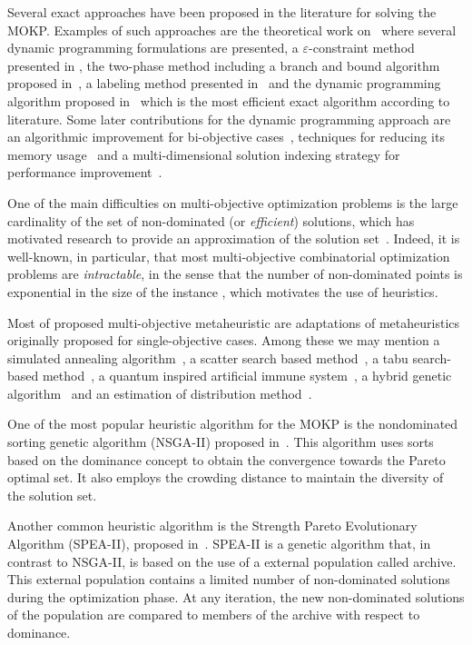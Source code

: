 Several exact approaches have been proposed in the literature for
solving the MOKP.
Examples of such approaches are
the theoretical work
on~\cite{klamroth2000dynamic} where several
dynamic programming formulations are presented,
a $\varepsilon$-constraint method presented in \cite{chankong2008multiobjective},
the two-phase method including a branch and bound algorithm proposed
in~\cite{visee1998two}, a labeling method presented
in~\cite{captivo2003solving} and the dynamic programming
algorithm proposed in~\cite{bazgan2009} which is the most
efficient exact algorithm according to literature.
Some later contributions for the dynamic programming approach
are an algorithmic improvement for bi-objective
cases~\cite{figueira2013algorithmic},
techniques for reducing its memory usage~\cite{correia2018} and
a multi-dimensional solution indexing strategy for performance
improvement~\cite{baroni2017}.

One of the main difficulties on multi-objective optimization problems
is the large cardinality of the set of non-dominated (or \emph{efficient}) solutions,
which has motivated research to provide an approximation of the solution
set~\cite{bazgan2015approximate, vanderpooten2017covers}.
Indeed, it is well-known, in particular, that most multi-objective combinatorial
optimization problems are \emph{intractable}, in the sense that
the number of non-dominated points is exponential in the size of the instance
\cite{ehrgott2013multicriteria}, which motivates the use of heuristics.

Most of proposed multi-objective metaheuristic are adaptations
of metaheuristics originally proposed for single-objective cases.
Among these we may mention
a simulated annealing algorithm~\cite{czyzzak1998pareto},
a scatter search based method~\cite{da2006scatter,da2007integrating},
a tabu search-based method~\cite{gandibleux2000tabu},
a quantum inspired artificial immune system~\cite{gao2014quantum},
a hybrid genetic algorithm~\cite{abdelaziz1999hybrid} and
an estimation of distribution method~\cite{martins2017hybrid}.

One of the most popular heuristic algorithm for the MOKP
is the nondominated sorting genetic algorithm (NSGA-II)
proposed in~\cite{deb2002fast}.
This algorithm uses sorts based on the dominance concept
to obtain the convergence towards the Pareto optimal set.
It also employs the crowding distance to maintain the diversity
of the solution set.

Another common heuristic algorithm is the Strength Pareto
Evolutionary Algorithm (SPEA-II), proposed in~\cite{zitzler2001spea2}.
SPEA-II is a genetic algorithm that, in contrast
to NSGA-II, is based on the use of a external population
called archive.
This external population contains a limited number of
non-dominated solutions during the optimization phase.
At any iteration, the new non-dominated solutions of the
population are compared to members of the archive
with respect to dominance.

